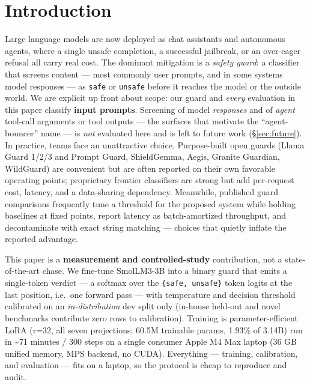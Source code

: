 \documentclass[sigconf,nonacm]{acmart}
\begin{document}
\maketitle

\section{Introduction}

Large language models are now deployed as chat assistants and autonomous agents, where a single unsafe completion, a successful jailbreak, or an over-eager refusal all carry real cost. The dominant mitigation is a \emph{safety guard}: a classifier that screens content --- most commonly user prompts, and in some systems model responses --- as \texttt{safe} or \texttt{unsafe} before it reaches the model or the outside world. We are explicit up front about scope: our guard and \emph{every} evaluation in this paper classify \textbf{input prompts}. Screening of model \emph{responses} and of \emph{agent} tool-call arguments or tool outputs --- the surfaces that motivate the ``agent-bouncer'' name --- is \emph{not} evaluated here and is left to future work (\S\ref{sec:future}). In practice, teams face an unattractive choice. Purpose-built open guards (Llama Guard 1/2/3 and Prompt Guard, ShieldGemma, Aegis, Granite Guardian, WildGuard) are convenient but are often reported on their own favorable operating points; proprietary frontier classifiers are strong but add per-request cost, latency, and a data-sharing dependency. Meanwhile, published guard comparisons frequently tune a threshold for the proposed system while holding baselines at fixed points, report latency as batch-amortized throughput, and decontaminate with exact string matching --- choices that quietly inflate the reported advantage.

This paper is a \textbf{measurement and controlled-study} contribution, not a state-of-the-art chase. We fine-tune SmolLM3-3B into a binary guard that emits a single-token verdict --- a softmax over the \texttt{\{safe, unsafe\}} token logits at the last position, i.e.\ one forward pass --- with temperature and decision threshold calibrated on an \emph{in-distribution} dev split only (in-house held-out and novel benchmarks contribute zero rows to calibration). Training is parameter-efficient LoRA (r=32, all seven projections; 60.5M trainable params, 1.93\% of 3.14B) run in \textasciitilde{}71 minutes / 300 steps on a single consumer Apple M4 Max laptop (36 GB unified memory, MPS backend, no CUDA). Everything --- training, calibration, and evaluation --- fits on a laptop, so the protocol is cheap to reproduce and audit.
\end{document}
